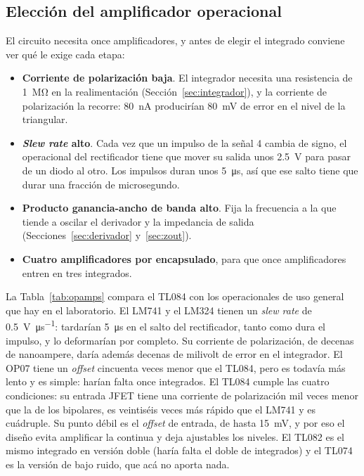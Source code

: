 \subsection{Elección del amplificador operacional}
\label{sec:opamp}
El circuito necesita once amplificadores, y antes de elegir el integrado conviene ver qué le exige cada etapa:
\begin{itemize}[leftmargin=*, nosep]
    \item \textbf{Corriente de polarización baja}. El integrador necesita una resistencia de \SI{1}{\mega\ohm} en la realimentación (Sección~\ref{sec:integrador}), y la corriente de polarización la recorre: \SI{80}{\nano\ampere} producirían \SI{80}{\milli\volt} de error en el nivel de la triangular.
    \item \textbf{\emph{Slew rate} alto}. Cada vez que un impulso de la señal 4 cambia de signo, el operacional del rectificador tiene que mover su salida unos \SI{2,5}{\volt} para pasar de un diodo al otro. Los impulsos duran unos \SI{5}{\micro\second}, así que ese salto tiene que durar una fracción de microsegundo.
    \item \textbf{Producto ganancia-ancho de banda alto}. Fija la frecuencia a la que tiende a oscilar el derivador y la impedancia de salida (Secciones~\ref{sec:derivador} y~\ref{sec:zout}).
    \item \textbf{Cuatro amplificadores por encapsulado}, para que once amplificadores entren en tres integrados.
\end{itemize}
La Tabla~\ref{tab:opamps} compara el TL084 con los operacionales de uso general que hay en el laboratorio. El LM741 y el LM324 tienen un \emph{slew rate} de \SI{0,5}{\volt\per\micro\second}: tardarían \SI{5}{\micro\second} en el salto del rectificador, tanto como dura el impulso, y lo deformarían por completo. Su corriente de polarización, de decenas de nanoampere, daría además decenas de milivolt de error en el integrador. El OP07 tiene un \emph{offset} cincuenta veces menor que el TL084, pero es todavía más lento y es simple: harían falta once integrados. El TL084 cumple las cuatro condiciones: su entrada JFET tiene una corriente de polarización mil veces menor que la de los bipolares, es veintiséis veces más rápido que el LM741 y es cuádruple. Su punto débil es el \emph{offset} de entrada, de hasta \SI{15}{\milli\volt}, y por eso el diseño evita amplificar la continua y deja ajustables los niveles. El TL082 es el mismo integrado en versión doble (haría falta el doble de integrados) y el TL074 es la versión de bajo ruido, que acá no aporta nada.

